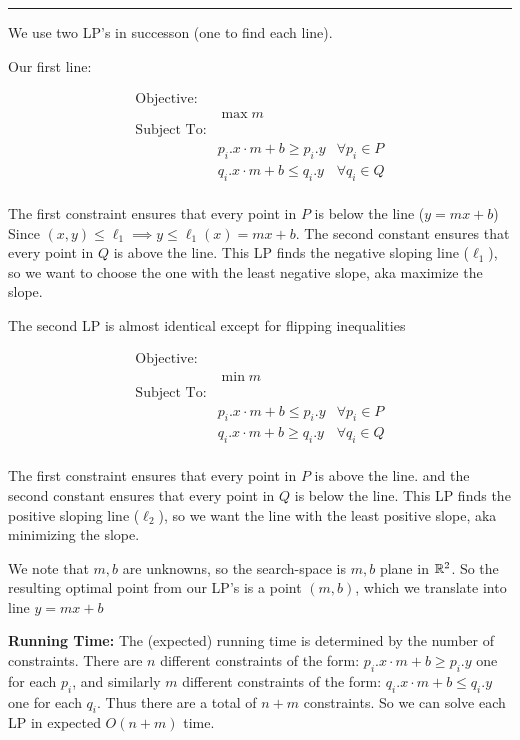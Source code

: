 \documentclass[11pt]{article}
\begin{document}
\hrule


We use two LP's in successon (one to find each line).

Our first line:



\begin{align*}
  \text{Objective: }\, & & \\
  & \max m & \\
  \text{Subject To:} & & \\
  & p_i.x \cdot m + b \geq p_i.y & \forall p_i \in P \\
  & q_i.x \cdot m + b \leq q_i.y & \forall q_i \in Q \\
\end{align*}

The first constraint ensures that every point in $P$ is below the line ($y = mx + b$)
Since $(x, y) \leq \ell_1 \implies y \leq \ell_1(x) = m x + b$.
The second constant ensures that every point in $Q$ is above the line.
This LP finds the negative sloping line ($\ell_1$), so we want to choose the one with the least negative slope,
aka maximize the slope.

The second LP is almost identical except for flipping inequalities

\begin{align*}
  \text{Objective: }\, & & \\
  & \min m & \\
  \text{Subject To:} & & \\
  & p_i.x \cdot m + b \leq p_i.y & \forall p_i \in P \\
  & q_i.x \cdot m + b \geq q_i.y & \forall q_i \in Q \\
\end{align*}

The first constraint ensures that every point in $P$ is above the line.
and the second constant ensures that every point in $Q$ is below the line.
This LP finds the positive sloping line ($\ell_2$), so we want the line with the least positive slope,
aka minimizing the slope.

We note that $m, b$ are unknowns, so the search-space is $m, b$ plane in $\mathbb{R} ^2$.
So the resulting optimal point from our LP's is a point $(m,b)$, which we translate into line $y = mx + b$

\textbf{Running Time:} The (expected) running time is determined by the number of constraints. 
There are $n$ different constraints of the form: $p_i.x \cdot m + b \geq p_i.y$ one for each $p_i$,
and similarly $m$ different constraints of the form: $q_i.x \cdot m + b \leq q_i.y$ one for each $q_i$.
Thus there are a total of $n + m$ constraints. So we can solve each LP in expected $O(n+m)$ time.
\end{document}
